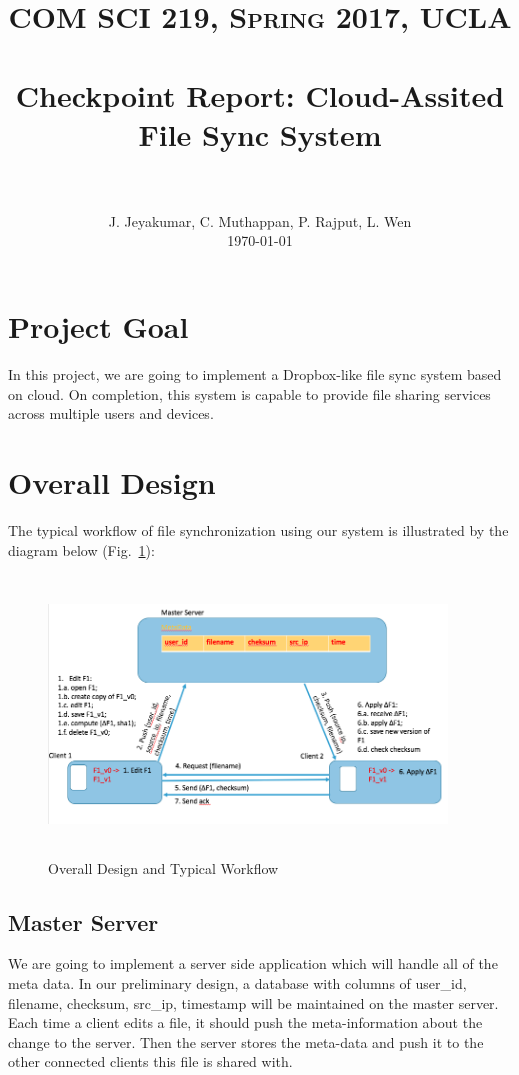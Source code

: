 \documentclass[paper=a4, fontsize=11pt]{scrartcl}
\title{
		\usefont{OT1}{bch}{b}{n}
		\normalfont \normalsize \textsc{COM SCI 219, Spring 2017, UCLA} \\ [25pt]
		\horrule{0.5pt} \\[0.4cm]
		\huge Checkpoint Report: Cloud-Assited File Sync System  \\
		\horrule{2pt} \\[0.5cm]
}
\author{
		\normalfont 								\normalsize
        J. Jeyakumar, C. Muthappan, P. Rajput, L. Wen\\[-3pt]		\normalsize
        \today
}
\date{}
\numberwithin{equation}{section}		%
\numberwithin{figure}{section}			%
\numberwithin{table}{section}				%
\begin{document}
\maketitle
\section{Project Goal}
In this project, we are going to implement a Dropbox-like file sync system based on cloud. On completion, this system is capable to provide file sharing services across multiple users and devices.  

\section{Overall Design}
The typical workflow of file synchronization using our system is illustrated by the diagram below (Fig.~\ref{fig:design}):
\begin{figure}[!htbp]
   \centering
   \includegraphics[height=280px, width=400px]{Design_cs219}
   \caption{Overall Design and Typical Workflow}
   \label{fig:design}
\end{figure}
\subsection{Master Server}
We are going to implement a server side application which will handle all of the meta data. In our preliminary design, a database with columns of user\_id, filename, checksum, src\_ip, timestamp will be maintained on the master server. Each time a client edits a file, it should push the meta-information about the change to the server. Then the server stores the  meta-data and push it to the other connected clients this file is shared with. 
\end{document}

